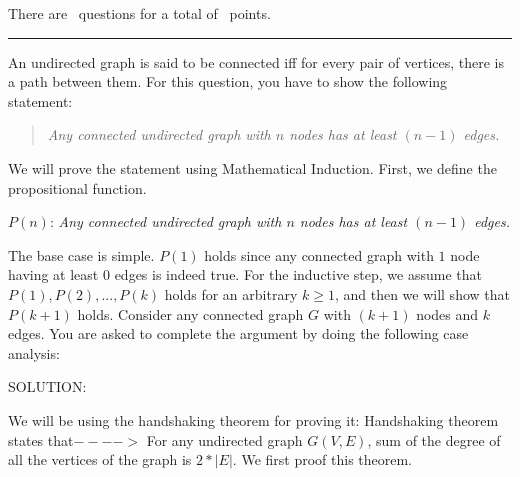 \documentclass[answers]{exam}
\begin{document}
\vspace{0.1in}
There are \numquestions\, questions for a total of \numpoints\, points.
\vspace{0.1in}
\hrule
 \vspace{0.2in}
\begin{questions}
 
\question An undirected graph is said to be connected iff for every pair of vertices, there is a path between them. For this question, you have to show the following statement: 
\begin{quote}
{\it Any connected undirected graph with $n$ nodes has at least $(n-1)$ edges.}
\end{quote}

We will prove the statement using Mathematical Induction. First, we define the propositional function. 

$P(n)$: \textit{Any connected undirected graph with $n$ nodes has at least $(n-1)$ edges.}

The base case is simple. $P(1)$ holds since any connected graph with $1$ node having at least $0$ edges is indeed true. 
For the inductive step, we assume that $P(1), P(2), ..., P(k)$ holds for an arbitrary $k \geq 1$, and then we will show that $P(k+1)$ holds. Consider any connected graph $G$ with $(k+1)$ nodes and $k$ edges. You are asked to complete the argument by doing the following case analysis:

\begin{solution}
SOLUTION:

We will be using the handshaking theorem for proving it:
Handshaking theorem states that$---->$ For any undirected graph $G(V,E)$, sum of the degree of all the vertices of the graph is $2*|E|$.
We first proof this theorem. 


\end{solution}
\end{questions}
\end{document}
